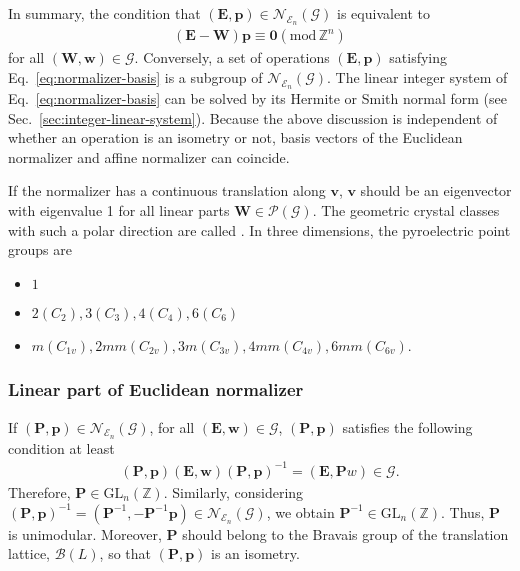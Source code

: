 In summary, the condition that $(\bm{E}, \bm{p} ) \in \mathcal{N}_{\mathcal{E}_{n}}(\mathcal{G})$ is equivalent to
\begin{align}
  \label{eq:normalizer-basis}
  (\bm{E} - \bm{W} ) \bm{p} \equiv \bm{0} ( \mathrm{mod} \, \mathbb{Z}^{n} )
\end{align}
for all $(\bm{W}, \bm{w}) \in \mathcal{G}$.
Conversely, a set of operations $(\bm{E}, \bm{p})$ satisfying Eq.~\eqref{eq:normalizer-basis} is a subgroup of $\mathcal{N}_{\mathcal{E}_{n}}(\mathcal{G})$.
The linear integer system of Eq.~\eqref{eq:normalizer-basis} can be solved by its Hermite or Smith normal form (see Sec.~\ref{sec:integer-linear-system}).
Because the above discussion is independent of whether an operation is an isometry or not, basis vectors of the Euclidean normalizer and affine normalizer can coincide.

If the normalizer has a continuous translation along $\bm{v}$, $\bm{v}$ should be an eigenvector with eigenvalue 1 for all linear parts $\bm{W} \in \mathcal{P}(\mathcal{G})$.
The geometric crystal classes with such a polar direction are called .
In three dimensions, the pyroelectric point groups are
\begin{itemize}
  \item $1$
  \item $2 (C_{2}), 3 (C_{3}), 4 (C_{4}), 6 (C_{6})$
  \item $m (C_{1v}), 2mm (C_{2v}), 3m (C_{3v}), 4mm (C_{4v}), 6mm (C_{6v})$.
\end{itemize}

\subsubsection{Linear part of Euclidean normalizer}

If $(\bm{P}, \bm{p} ) \in \mathcal{N}_{\mathcal{E}_{n}}(\mathcal{G})$, for all $(\bm{E}, \bm{w}) \in \mathcal{G}$, $(\bm{P}, \bm{p})$ satisfies the following condition at least
\begin{align}
  (\bm{P}, \bm{p}) (\bm{E}, \bm{w}) (\bm{P}, \bm{p})^{-1} = (\bm{E}, \bm{P}{w}) \in \mathcal{G}.
\end{align}
Therefore, $\bm{P} \in \mathrm{GL}_{n}(\mathbb{Z})$.
Similarly, considering $(\bm{P}, \bm{p} )^{-1} = (\bm{P}^{-1}, -\bm{P}^{-1}\bm{p} ) \in \mathcal{N}_{\mathcal{E}_{n}}(\mathcal{G})$, we obtain $\bm{P}^{-1} \in \mathrm{GL}_{n}(\mathbb{Z})$.
Thus, $\bm{P}$ is unimodular.
Moreover, $\bm{P}$ should belong to the Bravais group of the translation lattice, $\mathcal{B}(L)$, so that $(\bm{P}, \bm{p} )$ is an isometry.

